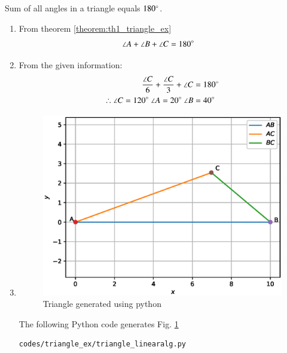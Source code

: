 \renewcommand{\theequation}{\theenumi}

\begin{theorem}\label{theorem:th1_triangle_ex}
Sum of all angles in a triangle equals $180\degree$.
\end{theorem}

\begin{enumerate}[label=\thesubsection.\arabic*.,ref=\thesubsection.\theenumi]

\item \solution  From theorem \ref{theorem:th1_triangle_ex}
\begin{align}
\angle A + \angle B + \angle C &=  180\degree
\end{align}

\item From the given information:
\begin{align}
\frac{\angle C}{6} + \frac{\angle C}{3} + \angle C &=  180\degree\\
\therefore \angle C = 120\degree \ \angle A = 20\degree \ \angle B &= 40\degree \nonumber
\end{align}

\item \begin{figure}[!h]
\centering
\includegraphics[width=\columnwidth]{./figs/triangle_ex/triangle_linearalg.eps}
\caption{Triangle generated using python}
\label{fig:triangle2_triangle_ex}
\end{figure} 

The  following Python code generates Fig. \ref{fig:triangle2_triangle_ex}

\begin{lstlisting}
codes/triangle_ex/triangle_linearalg.py
\end{lstlisting}

\end{enumerate}

\pagebreak
